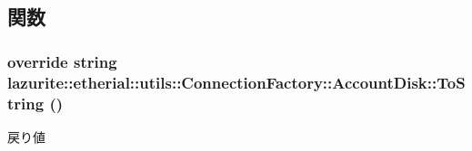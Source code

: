 \subsection{関数}
\hypertarget{classlazurite_1_1etherial_1_1utils_1_1_connection_factory_1_1_account_disk_a7943deff79dfd41d82ad0e2a349650f8}{
\subsubsection[{ToString}]{\setlength{\rightskip}{0pt plus 5cm}override string lazurite::etherial::utils::ConnectionFactory::AccountDisk::ToString ()}}
\label{classlazurite_1_1etherial_1_1utils_1_1_connection_factory_1_1_account_disk_a7943deff79dfd41d82ad0e2a349650f8}
\begin{DoxyReturn}{戻り値}

\end{DoxyReturn}



